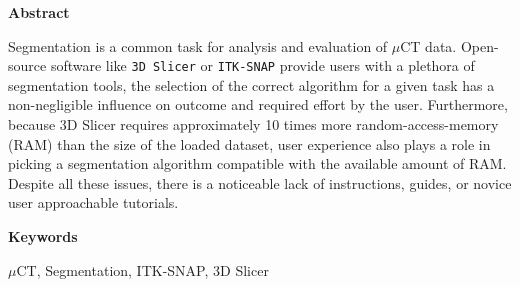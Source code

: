 
\newcommand*{\AbstractHead}[1]{%
	{\noindent\color{header-blue}\Large\textbf{#1}}
	\vspace{10pt}\\
}%

\newcommand*{\SomeSpace}{%
	\vspace{\baselineskip}
}

\AbstractHead{Abstract}
\noindent
\normalsize
\begin{body}
	Segmentation is a common task for analysis and evaluation of $\mu$CT data. Open-source software like \texttt{3D Slicer} or \texttt{ITK-SNAP} provide users with a plethora of segmentation tools, the selection of the correct algorithm for a given task has a non-negligible influence on outcome and required effort by the user. Furthermore, because 3D Slicer requires approximately 10 times more random-access-memory (RAM) than the size of the loaded dataset, user experience also plays a role in picking a segmentation algorithm compatible with the available amount of RAM.
	Despite all these issues, there is a noticeable lack of instructions, guides, or novice user approachable tutorials.

\end{body}
\SomeSpace
\AbstractHead{Keywords}
\label{s:Keywords}
\normalsize
\noindent
\begin{body}
	\noindent
	$\mu$CT, Segmentation, ITK-SNAP, 3D Slicer
\end{body}
\glsresetall
\SomeSpace

\SomeSpace
\normalsize

\glsresetall
